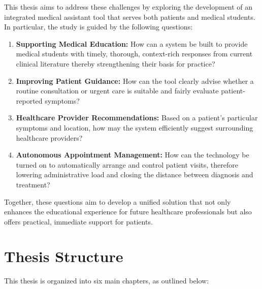 This thesis aims to address these challenges by exploring the development of an integrated medical assistant tool that serves both patients and medical students. In particular, the study is guided by the following questions:
\begin{enumerate}[itemsep=2em]
    \item \textbf{Supporting Medical Education:} How can a system be built to provide medical students with timely, thorough, context-rich responses from current clinical literature thereby strengthening their basis for practice?
    \item \textbf{Improving Patient Guidance:} How can the tool clearly advise whether a routine consultation or urgent care is suitable and fairly evaluate patient-reported symptoms?
    \item \textbf{Healthcare Provider Recommendations:} Based on a patient's particular symptoms and location, how may the system efficiently suggest surrounding healthcare providers?
    \item \textbf{Autonomous Appointment Management:} How can the technology be turned on to automatically arrange and control patient visits, therefore lowering administrative load and closing the distance between diagnosis and treatment?
\end{enumerate}


Together, these questions aim to develop a unified solution that not only enhances the educational experience for future healthcare professionals but also offers practical, immediate support for patients.

\vspace{12cm}
\section{Thesis Structure}
\label{sec:thesis-structure}

This thesis is organized into six main chapters, as outlined below:

